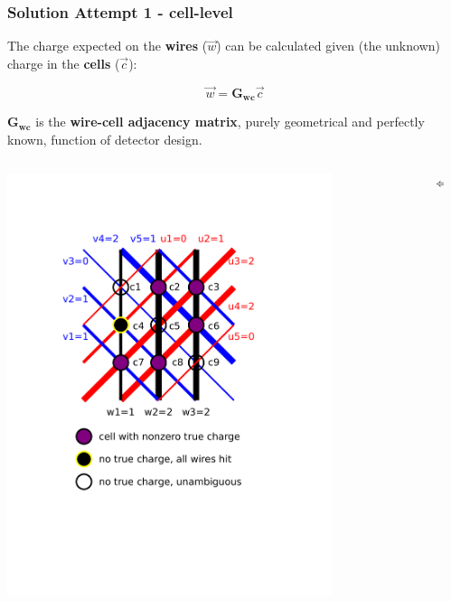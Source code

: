 \begin{frame}[fragile]
  \frametitle{Solution Attempt 1 - cell-level}
  The charge expected on the \textbf{wires} ($\vec{w}$) can be calculated
  given (the unknown) charge in the \textbf{cells} ($\vec{c}$):

  \[\vec{w} = \mathbf{G_{wc}}\vec{c}\]

  $\mathbf{G_{wc}}$ is the \textbf{wire-cell adjacency matrix}, purely
  geometrical and perfectly known, function of detector design.
  
  \begin{columns}
    \begin{column}{0.45\textwidth}
      \vspace{-5mm}

      \flushright \includegraphics[width=0.8\textwidth,trim=1cm 11cm 2cm 2cm,clip]{example-hit-cells.pdf}

    \end{column}
    \begin{column}{0.10\textwidth}
      $\Leftrightarrow$
    \end{column}
    \begin{column}{0.45\textwidth}

\end{column}
\end{columns}
\end{frame}
